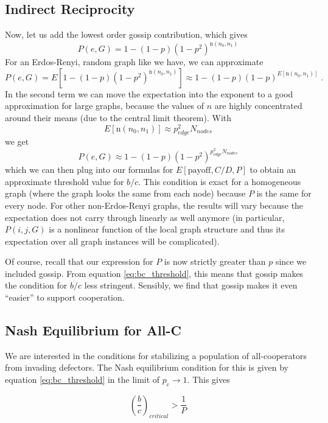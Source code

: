 \documentclass{article}
\renewcommand{\=}[1]{\stackrel{#1}{=}} %
\begin{document}
\subsection{Indirect Reciprocity}
Now, let us add the lowest order gossip contribution, which gives
\[P(e,G) = 1 - (1-p)(1-p^2)^{\text{n}(n_0,n_1)}\]
For an Erdos-Renyi, random graph like we have, we can approximate
\[P(e,G) = E[1 - (1-p)(1-p^2)^{\text{n}(n_0,n_1)}] \approx 1 - (1-p)(1-p)^{E[\text{n}(n_0,n_1)]}\;.\]
In the second term we can move the expectation into the exponent to a good approximation for large graphs, because the values of $n$ are highly concentrated around their means (due to the central limit theorem). With
\[E[\text{n}(n_0,n_1)] \approx p_{edge}^2N_{nodes}\]
we get
\begin{equation}\label{eq:P_first_order}
P(e,G) \approx 1 - (1-p)(1-p^2)^{p_{edge}^2N_{nodes}}
\end{equation}
which we can then plug into our formulas for $E[\text{payoff},C/D,P]$ to obtain an approximate threshold value for $b/c$. This condition is exact for
a homogeneous graph (where the graph looks the same from each node) because $P$ is the same for every node. For other non-Erdos-Renyi
graphs, the results will vary because the expectation does not carry
through linearly as well anymore (in particular, $P(i,j,G)$ is a
nonlinear function of the local graph structure and thus its expectation
over all graph instances will be complicated).

Of course, recall that our expression for $P$ is now strictly greater than $p$ since we included gossip. From equation \ref{eq:bc_threshold}, this means that gossip makes the condition for $b/c$ less stringent. Sensibly, we find that gossip makes it even ``easier'' to support cooperation. 


\subsection{Nash Equilibrium for All-C}
We are interested in the conditions for stabilizing a population of all-cooperators from invading defectors. The Nash equilibrium condition for this is given by equation \ref{eq:bc_threshold} in the limit of $p_c \to 1$. This gives

\begin{equation}\label{eq:bc_threshold}
\left(\frac{b}{c}\right)_{critical} > \frac{1}{P}
\end{equation}
\end{document}
